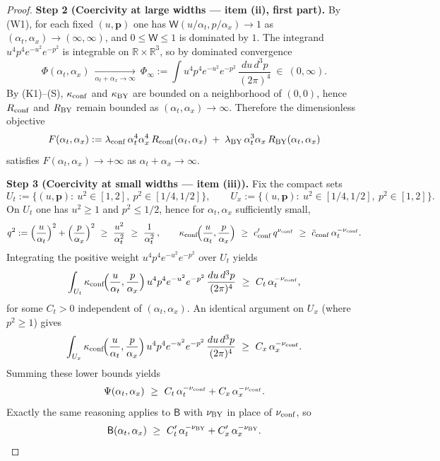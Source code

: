 \documentclass[10pt]{article}
\theoremstyle{definition}
\theoremstyle{plain}
\begin{document}
\begin{proof}
\medskip
\noindent\textbf{Step 2 (Coercivity at large widths — item (ii), first part).}
By (W1), for each fixed $(u,\mathbf p)$ one has
$\mathsf W(u/\alpha_t,p/\alpha_x)\to 1$ as $(\alpha_t,\alpha_x)\to(\infty,\infty)$, and
$0\le \mathsf W\le 1$ is dominated by $1$. The integrand $u^4 p^4 e^{-u^2}e^{-p^2}$ is integrable on $\mathbb R\times\mathbb R^3$, so by dominated convergence
\[
\Phi(\alpha_t,\alpha_x)\ \xrightarrow[\alpha_t+\alpha_x\to\infty]{}\ \Phi_\infty
:=\int u^4 p^4 e^{-u^2}e^{-p^2}\,\frac{du\,d^3p}{(2\pi)^4}\ \in\ (0,\infty).
\]
By (K1)–(S), $\kappa_{\rm conf}$ and $\kappa_{\rm BY}$ are bounded on a neighborhood of $(0,0)$, hence $R_{\rm conf}$ and $R_{\rm BY}$ remain bounded as $(\alpha_t,\alpha_x)\to\infty$. Therefore the dimensionless objective
\[
F(\alpha_t,\alpha_x)
:=\lambda_{\rm conf}\,\alpha_t^{4}\alpha_x^{4}\,R_{\rm conf}(\alpha_t,\alpha_x)
\;+\;\lambda_{\rm BY}\,\alpha_t^{3}\alpha_x\,R_{\rm BY}(\alpha_t,\alpha_x)
\]
satisfies $F(\alpha_t,\alpha_x)\to+\infty$ as $\alpha_t+\alpha_x\to\infty$.

\medskip
\noindent\textbf{Step 3 (Coercivity at small widths — item (iii)).}
Fix the compact sets
\[
U_t:=\{(u,\mathbf p):\ u^2\in[1,2],\ p^2\in[1/4,1/2]\},\qquad
U_x:=\{(u,\mathbf p):\ u^2\in[1/4,1/2],\ p^2\in[1,2]\}.
\]
On $U_t$ one has $u^2\ge 1$ and $p^2\le 1/2$, hence for $\alpha_t,\alpha_x$ sufficiently small,
\[
q^2:=\Big(\frac{u}{\alpha_t}\Big)^2+\Big(\frac{p}{\alpha_x}\Big)^2
\ \ge\ \frac{u^2}{\alpha_t^2}\ \ge\ \frac{1}{\alpha_t^2}\,,
\qquad
\kappa_{\rm conf}\!\Big(\frac{u}{\alpha_t},\frac{p}{\alpha_x}\Big)
\ \ge\ c'_{\rm conf}\,q^{\nu_{\rm conf}}
\ \ge\ \tilde c_{\rm conf}\,\alpha_t^{-\nu_{\rm conf}}.
\]
Integrating the positive weight $u^4 p^4 e^{-u^2}e^{-p^2}$ over $U_t$ yields
\[
\int_{U_t}\kappa_{\rm conf}\!\Big(\frac{u}{\alpha_t},\frac{p}{\alpha_x}\Big)\,
u^4 p^4 e^{-u^2}e^{-p^2}\,\frac{du\,d^3p}{(2\pi)^4}\ \ge\ C_t\,\alpha_t^{-\nu_{\rm conf}},
\]
for some $C_t>0$ independent of $(\alpha_t,\alpha_x)$. An identical argument on $U_x$ (where $p^2\ge 1$) gives
\[
\int_{U_x}\kappa_{\rm conf}\!\Big(\frac{u}{\alpha_t},\frac{p}{\alpha_x}\Big)\,
u^4 p^4 e^{-u^2}e^{-p^2}\,\frac{du\,d^3p}{(2\pi)^4}\ \ge\ C_x\,\alpha_x^{-\nu_{\rm conf}}.
\]
Summing these lower bounds yields
\[
\Psi(\alpha_t,\alpha_x)\ \ge\ C_t\,\alpha_t^{-\nu_{\rm conf}}+C_x\,\alpha_x^{-\nu_{\rm conf}}.
\]
Exactly the same reasoning applies to $\mathsf B$ with $\nu_{\rm BY}$ in place of $\nu_{\rm conf}$, so
\[
\mathsf B(\alpha_t,\alpha_x)\ \ge\ C_t'\,\alpha_t^{-\nu_{\rm BY}}+C_x'\,\alpha_x^{-\nu_{\rm BY}}.
\]


\end{proof}
\end{document}
